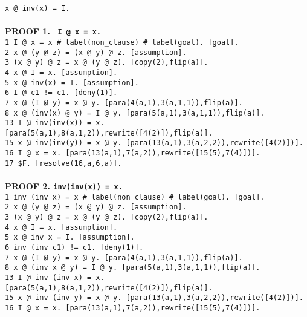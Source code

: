 \documentclass[a4paper]{article}
\begin{document}
	{\tt x @ inv(x) = I.}
	\\
	\\
	\textbf{PROOF 1. \tt{ I @ x = x.}}\\     
	{\tt 1 I @ x = x \# label(non\_clause) \# label(goal).  [goal].}\\
	{\tt 2 x @ (y @ z) = (x @ y) @ z.  [assumption].}\\
	{\tt 3 (x @ y) @ z = x @ (y @ z).  [copy(2),flip(a)].}\\
	{\tt 4 x @ I = x.  [assumption].}\\
	{\tt 5 x @ inv(x) = I.  [assumption].}\\
	{\tt 6 I @ c1 != c1.  [deny(1)].}\\
	{\tt 7 x @ (I @ y) = x @ y.  [para(4(a,1),3(a,1,1)),flip(a)].}\\
	{\tt 8 x @ (inv(x) @ y) = I @ y.  [para(5(a,1),3(a,1,1)),flip(a)].}\\
	{\tt 13 I @ inv(inv(x)) = x.  [para(5(a,1),8(a,1,2)),rewrite([4(2)]),flip(a)].}\\
	{\tt 15 x @ inv(inv(y)) = x @ y.  [para(13(a,1),3(a,2,2)),rewrite([4(2)])].}\\
	{\tt 16 I @ x = x.  [para(13(a,1),7(a,2)),rewrite([15(5),7(4)])].}\\
	{\tt 17 \$F.  [resolve(16,a,6,a)].}\\
	\\
	\textbf{PROOF 2. {\tt  inv(inv(x)) = x.}}\\        
	{\tt 1 inv (inv x) = x \# label(non\_clause) \# label(goal).  [goal].}\\
	{\tt 2 x @ (y @ z) = (x @ y) @ z.  [assumption].}\\
	{\tt 3 (x @ y) @ z = x @ (y @ z).  [copy(2),flip(a)].}\\
	{\tt 4 x @ I = x.  [assumption].}\\
	{\tt 5 x @ inv x = I.  [assumption].}\\
	{\tt 6 inv (inv c1) != c1.  [deny(1)].}\\
	{\tt 7 x @ (I @ y) = x @ y.  [para(4(a,1),3(a,1,1)),flip(a)].}\\
	{\tt 8 x @ (inv x @ y) = I @ y.  [para(5(a,1),3(a,1,1)),flip(a)].}\\
	{\tt 13 I @ inv (inv x) = x.  [para(5(a,1),8(a,1,2)),rewrite([4(2)]),flip(a)].}\\
	{\tt 15 x @ inv (inv y) = x @ y.  [para(13(a,1),3(a,2,2)),rewrite([4(2)])].}\\
	{\tt 16 I @ x = x.  [para(13(a,1),7(a,2)),rewrite([15(5),7(4)])].}\\
\end{document}
